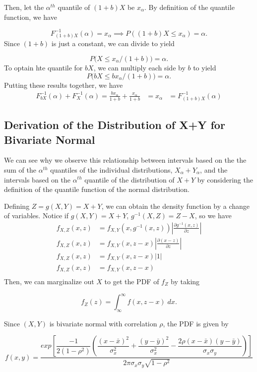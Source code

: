 \documentclass[12pt,twoside]{smiththesis}
\begin{document}
Then, let the \(\alpha^{th}\) quantile of \((1+b)X\) be \(x_\alpha\). By definition of the quantile function, we have

\[F^{-1}_{(1+b) X } (\alpha) = x_\alpha \implies P((1+b) X \leq x_\alpha) = \alpha.\]
Since \((1+b)\) is just a constant, we can divide to yield

\[P\Big( X \leq x_\alpha/(1+b) \Big) = \alpha.\]
To optain hte quantile for \(bX\), we can multiply each side by \(b\) to yield
\[P\Big( bX \leq bx_\alpha/(1+b) \Big) = \alpha.\]
Putting these results together, we have
\begin{align*}
F^{-1}_{bX} (\alpha) + F^{-1}_{X} (\alpha) = \frac{bx_\alpha } { 1+b} + \frac{x_\alpha}{1+b}
&= x_\alpha 
&= F^{-1}_{(1+b)X}(\alpha) \end{align*}

\hypertarget{conservativeintervals}{%
\subsection{Derivation of the Distribution of X+Y for Bivariate Normal}\label{conservativeintervals}}

We can see why we observe this relationship between intervals based on the the sum of the \(\alpha^{th}\) quantiles of the individual distributions, \(X_\alpha + Y_\alpha\), and the intervals based on the \(\alpha^{th}\) quantile of the distribution of \(X+Y\) by considering the definition of the quantile function of the normal distribution.

Defining \(Z=g(X,Y) = X+Y\), we can obtain the density function by a change of variables. Notice if \(g(X,Y) = X+Y\), \(g^{-1}(X,Z) = Z-X\), so we have
\begin{align*} f_{X,Z}(x,z) &= f_{X,Y}(x,g^{-1}(x,z)) \left|\frac{\partial g^{-1}(x,z)}{\partial z}\right| \\
f_{X,Z}(x,z) &= f_{X,Y}(x,z-x) \left|\frac{\partial (x-z)}{\partial z}\right|\\
f_{X,Z}(x,z) &= f_{X,Y}(x,z-x) \left|1\right|\\
f_{X,Z}(x,z) &= f_{X,Y}(x,z-x) \\
\end{align*}
Then, we can marginalize out \(X\) to get the PDF of \(f_Z\) by taking

\[f_Z(z) = \int_{\infty}^\infty f(x,z-x) \; dx.\]

Since \((X,Y)\) is bivariate normal with correlation \(\rho\), the PDF is given by

\[f(x,y) = \dfrac{exp\left[\dfrac{-1}{2(1-\rho^2)} \left( \dfrac{(x-\bar x)^2}{\sigma_x^2}+\dfrac{(y-\bar y)^2}{\sigma_x^2} - \dfrac{2 \rho (x-\bar x)(y-\bar y)}{\sigma_x\sigma_y} \right)\right]}{2\pi \sigma_x \sigma_y \sqrt{1- \rho^2}}\]
\end{document}

